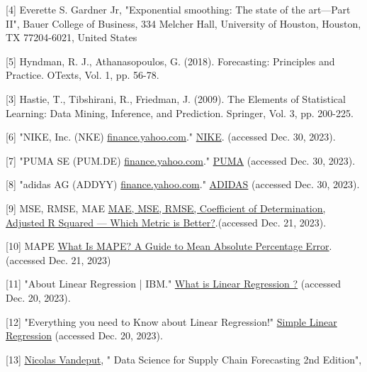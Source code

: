 \documentclass[conference]{IEEEtran}
\begin{document}
{[4] Everette S. Gardner Jr, "Exponential smoothing: The state of the art—Part II", Bauer College of Business, 334 Melcher Hall, University of Houston, Houston, TX 77204-6021, United States

[5] Hyndman, R. J.,  Athanasopoulos, G. (2018). Forecasting: Principles and Practice. OTexts, Vol. 1, pp. 56-78.

[3] Hastie, T., Tibshirani, R.,  Friedman, J. (2009). The Elements of Statistical Learning: Data Mining, Inference, and Prediction. Springer, Vol. 3, pp. 200-225.

[6] "NIKE, Inc. (NKE) \href{https://finance.yahoo.com/lookup?s=DATA}{finance.yahoo.com}." \href{https://finance.yahoo.com/quote/NKE/history?period1=1546128000&period2=1703894400&interval=1d&filter=history&frequency=1d&includeAdjustedClose=true}{NIKE}. (accessed Dec. 30, 2023).

[7] "PUMA SE (PUM.DE) \href{https://finance.yahoo.com/lookup?s=DATA}{finance.yahoo.com}." \href{https://finance.yahoo.com/quote/PUM.DE/history?period1=1546128000&period2=1703894400&interval=1d&filter=history&frequency=1d&includeAdjustedClose=true}{PUMA} (accessed Dec. 30, 2023).

[8] "adidas AG (ADDYY) \href{https://finance.yahoo.com/lookup?s=DATA}{finance.yahoo.com}." \href{https://finance.yahoo.com/quote/ADDYY/history?period1=1546128000&period2=1703894400&interval=1d&filter=history&frequency=1d&includeAdjustedClose=true}{ADIDAS} (accessed Dec. 30, 2023).

[9] MSE, RMSE, MAE \href{https://medium.com/analytics-vidhya/mae-mse-rmse-coefficient-of-determination-adjusted-r-squared-which-metric-is-better-cd0326a5697e}{MAE, MSE, RMSE, Coefficient of Determination, Adjusted R Squared — Which Metric is Better?}.(accessed Dec. 21, 2023).

[10] MAPE \href{https://www.indeed.com/career-advice/career-development/what-is-mape}{What Is MAPE? A Guide to Mean Absolute Percentage Error}.(accessed Dec. 21, 2023)

[11] "About Linear Regression | IBM." \href{https://www.ibm.com/topics/linear-regression}{What is Linear Regression ?} (accessed Dec. 20, 2023).

[12] "Everything you need to Know about Linear Regression!" \href{https://www.analyticsvidhya.com/blog/2021/10/everything-you-need-to-know-about-linear-regression/}{Simple Linear Regression} (accessed Dec. 20, 2023).

[13] \href{https://www.amazon.com/Nicolas-Vandeput/e/B07KL86HMV/ref=dp_byline_cont_book_1}{Nicolas Vandeput}, " Data Science for Supply Chain Forecasting 2nd Edition", 

}
\end{document}
